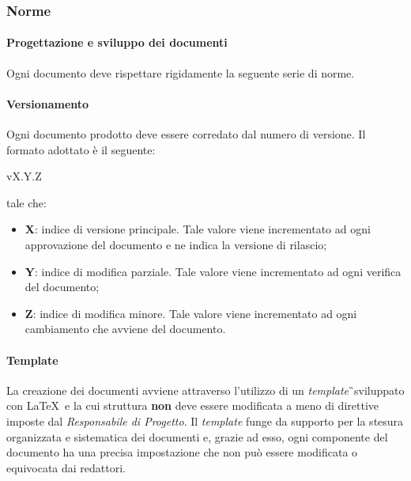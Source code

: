 \subsubsection{Norme}
\paragraph{Progettazione e sviluppo dei documenti}
Ogni documento deve rispettare rigidamente la seguente serie di norme.

\paragraph{Versionamento}
Ogni documento prodotto deve essere corredato dal numero di versione. Il formato adottato è
il seguente:
\begin{center}
	vX.Y.Z
\end{center}
tale che:
\begin{itemize}
	\item{\textbf{X}}: indice di versione principale. Tale valore viene incrementato ad ogni approvazione del documento e ne indica la versione di rilascio;
	\item{\textbf{Y}}: indice di modifica parziale. Tale valore viene incrementato ad ogni verifica del documento;
	\item{\textbf{Z}}: indice di modifica minore. Tale valore viene incrementato ad ogni cambiamento che avviene del documento.
\end{itemize}

\paragraph{Template}
La creazione dei documenti avviene attraverso l'utilizzo di un \textit{template}\G\ sviluppato con \LaTeX\ e la cui struttura \textbf{non} deve essere modificata a meno di direttive imposte dal \textit{Responsabile di Progetto}. Il \textit{template} funge da supporto per la stesura organizzata e sistematica dei documenti e, grazie ad esso, ogni componente del documento ha una precisa impostazione che non può essere modificata o equivocata dai redattori.

